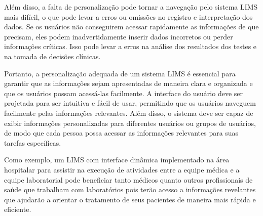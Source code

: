 
Além disso, a falta de personalização pode tornar a navegação pelo sistema LIMS mais difícil, o que pode levar a erros ou omissões no registro e interpretação dos dados. Se os usuários não conseguirem acessar rapidamente as informações de que precisam, eles podem inadvertidamente inserir dados incorretos ou perder informações críticas. Isso pode levar a erros na análise dos resultados dos testes e na tomada de decisões clínicas.

Portanto, a personalização adequada de um sistema LIMS é essencial para garantir que as informações sejam apresentadas de maneira clara e organizada e que os usuários possam acessá-las facilmente. A interface do usuário deve ser projetada para ser intuitiva e fácil de usar, permitindo que os usuários naveguem facilmente pelas informações relevantes. Além disso, o sistema deve ser capaz de exibir informações personalizadas para diferentes usuários ou grupos de usuários, de modo que cada pessoa possa acessar as informações relevantes para suas tarefas específicas.


Como exemplo, um LIMS com interface dinâmica implementado na área hospitalar para assistir na execução de atividades entre a equipe médica e a equipe laboratorial pode beneficiar tanto médicos quanto outros profissionais de saúde que trabalham com laboratórios pois terão acesso a informações revelantes que ajudarão a orientar o tratamento de seus pacientes de maneira mais rápida e eficiente.